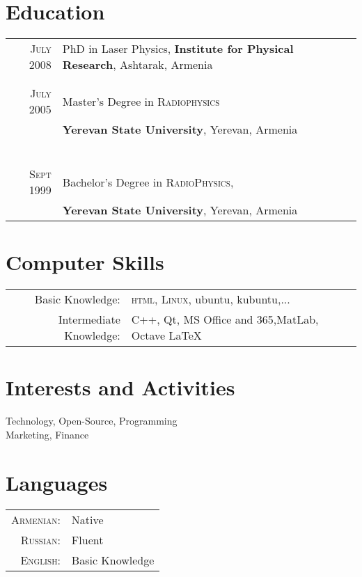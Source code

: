 \documentclass[a4paper,10pt]{article}
\begin{document}
\section{Education}
\begin{tabular}{rl}	
 \textsc{July} 2008 & PhD in Laser Physics, \textbf{Institute for Physical Research}, Ashtarak, Armenia\\

\\&\\
\textsc{July} 2005& Master's Degree in  \textsc{Radiophysics} \\&\normalsize\textbf{Yerevan State University}, Yerevan, Armenia\\
\
\\&\\
\textsc{Sept} 1999& Bachelor's Degree in  \textsc{RadioPhysics},\\&\normalsize\textbf{Yerevan State University}, Yerevan, Armenia\\


\end{tabular}

\section{Computer Skills}
\begin{tabular}{rl}
	Basic Knowledge:&  \textsc{html}, \textsc{Linux}, ubuntu, kubuntu,... \\
	Intermediate Knowledge:& C++, Qt, MS Office and 365,MatLab, Octave {\fb \LaTeX}\setmainfont[SmallCapsFont=Fontin-SmallCaps.otf]{Fontin.otf}\\
\end{tabular}


\section{Interests and Activities}
Technology, Open-Source, Programming\\
Marketing, Finance\\
\section{Languages}
\begin{tabular}{rl}
	\textsc{Armenian:}&Native\\
	\textsc{Russian:}& Fluent\\
	\textsc{English:}&Basic Knowledge\\
\end{tabular}
\end{document}
